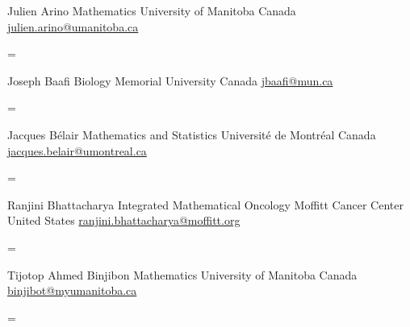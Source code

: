 \documentclass[
  letterpaper,
  DIV=11,
  numbers=noendperiod]{scrartcl}
\newenvironment{absolutelynopagebreak}
  {\par\nobreak\vfil\penalty0\vfilneg
   \vtop\bgroup}
  {\par\xdef\tpd{\the\prevdepth}\egroup
   \prevdepth=\tpd}
\begin{document}
\begin{absolutelynopagebreak}Julien   Arino \newline
\mbox{}\quad  Mathematics \newline
\mbox{}\quad  University of Manitoba \newline
\mbox{}\quad  Canada \newline
\mbox{}\quad \href{mailto: julien.arino@umanitoba.ca }{ julien.arino@umanitoba.ca }
\end{absolutelynopagebreak}\vskip0.2cm
\begin{absolutelynopagebreak}Joseph   Baafi \newline
\mbox{}\quad  Biology \newline
\mbox{}\quad  Memorial University \newline
\mbox{}\quad  Canada \newline
\mbox{}\quad \href{mailto: jbaafi@mun.ca }{ jbaafi@mun.ca }
\end{absolutelynopagebreak}\vskip0.2cm
\begin{absolutelynopagebreak}Jacques   Bélair \newline
\mbox{}\quad  Mathematics and Statistics \newline
\mbox{}\quad  Université de Montréal \newline
\mbox{}\quad  Canada \newline
\mbox{}\quad \href{mailto: jacques.belair@umontreal.ca }{ jacques.belair@umontreal.ca }
\end{absolutelynopagebreak}\vskip0.2cm
\begin{absolutelynopagebreak}Ranjini   Bhattacharya \newline
\mbox{}\quad  Integrated Mathematical Oncology \newline
\mbox{}\quad  Moffitt Cancer Center \newline
\mbox{}\quad  United States \newline
\mbox{}\quad \href{mailto: ranjini.bhattacharya@moffitt.org }{ ranjini.bhattacharya@moffitt.org }
\end{absolutelynopagebreak}\vskip0.2cm
\begin{absolutelynopagebreak}Tijotop Ahmed    Binjibon \newline
\mbox{}\quad  Mathematics \newline
\mbox{}\quad  University of Manitoba \newline
\mbox{}\quad  Canada \newline
\mbox{}\quad \href{mailto: binjibot@myumanitoba.ca }{ binjibot@myumanitoba.ca }
\end{absolutelynopagebreak}\vskip0.2cm
\end{document}
